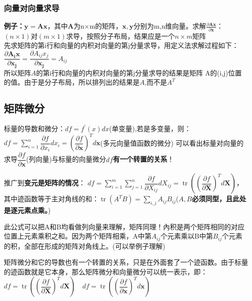    \subsubsection{向量对向量求导}
    \textbf{例子：}$\mathbf{y}=\mathbf{A} \mathbf{x}$，其中$\mathbf{A}$为n×m的矩阵，$\mathbf{x}, \mathbf{y}$分别为m,n维向量。求解$\frac{\partial \mathbf{A} \mathbf{x}}{\partial \mathbf{x}}$：
    \\
    $(n\times 1)$对$(m\times 1)$求导，按照分子布局，结果应是一个$n\times m$矩阵
    \\
    先求矩阵的第i行和向量的内积对向量的第j分量求导，用定义法求解过程如下：$\dfrac{\partial \mathbf{A}_{\mathbf{i}} \mathbf{x}}{\partial \mathbf{x}_{\mathbf{j}}}=\dfrac{\partial A_{i j} x_{j}}{\partial \mathbf{x}_{\mathbf{j}}}=A_{i j}$
    \\
    所以矩阵$A$的第i行和向量的内积对向量的第j分量求导的结果是矩阵 A的(i,j)位置的值。由于是分子布局，所以排列出的结果是$A$,而不是$A^T$

    \subsection{矩阵微分}
    标量的导数和微分：$d f=f^{\prime}(x) d x$(单变量),若是多变量，则：$d f=\sum_{i=1}^{n} \dfrac{\partial f}{\partial x_{i}} d x_{i}=\left(\dfrac{\partial f}{\partial \mathbf{x}}\right)^{T} d \mathbf{x}$(多元向量值函数的微分)
    可以看出标量对向量的求导$\dfrac{\partial f}{\partial \mathbf{x}}$(列向量)与标量的向量微分$d f$\textbf{有一个转置的关系}！


    推广到\textbf{变元是矩阵的情况}：
    $d f=\sum_{i=1}^{m} \sum_{j=1}^{n} \dfrac{\partial f}{\partial X_{i j}} d X_{i j}=\operatorname{tr}\left(\left(\dfrac{\partial f}{\partial \mathbf{X}}\right)^{T} d \mathbf{X}\right)$，其中迹函数等于主对角线的和：$\operatorname{tr}\left(A^{T} B\right)=\sum_{i, j} A_{i j} B_{i j}$(\textbf{$A, B$必须同型，且此处是逐元素点乘。})


    此公式可以把A和B均看做列向量来理解，矩阵同理！內积是两个矩阵相同的对应位置上元素乘积之和。因为两个矩阵相乘，A中第$A_{ij}$个元素乘以B中第$B_{ij}$个元素的积，全部在形成的矩阵对角线上。(可以举例子理解)


    矩阵微分和它的导数也有一个转置的关系，只是在外面套了一个迹函数。由于标量的迹函数就是它本身，那么矩阵微分和向量微分可以统一表示，即：$d f=\operatorname{tr}\left(\left(\dfrac{\partial f}{\partial \mathbf{X}}\right)^{T} d \mathbf{X}\right) \quad d f=\operatorname{tr}\left(\left(\dfrac{\partial f}{\partial \mathbf{x}}\right)^{T} d \mathbf{x}\right)$

